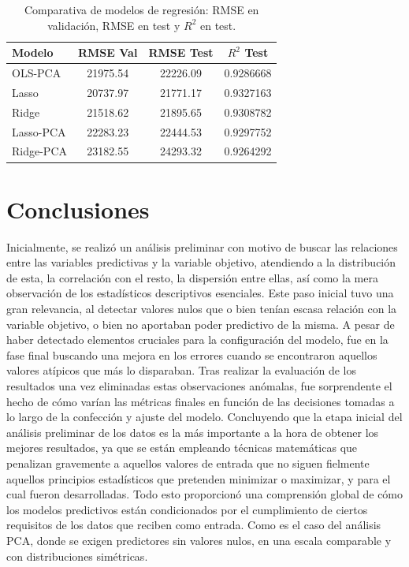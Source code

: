 \documentclass[a4paper,twocolumn]{article}
\begin{document}
	\begin{table}[tb]
		\centering
		{\small
		\caption{Comparativa de modelos de regresión: RMSE en validación, RMSE en test y $R^2$ en test.}
		\label{tab:resultados}
		\setlength{\tabcolsep}{4pt}
		\begin{tabular}{|l|c|c|c|}
			\hline\hline
			\textbf{Modelo} & \textbf{RMSE Val} & \textbf{RMSE Test} & \textbf{$R^2$ Test} \\\hline
			OLS-PCA & 21975.54 & 22226.09 & 0.9286668 \\\hline
			Lasso & 20737.97 & 21771.17 & 0.9327163 \\\hline
			Ridge & 21518.62 & 21895.65 & 0.9308782 \\\hline
			Lasso-PCA & 22283.23 & 22444.53 & 0.9297752 \\\hline
			Ridge-PCA & 23182.55 & 24293.32 & 0.9264292 \\\hline\hline
		\end{tabular}
		}
	\end{table}


	\section{Conclusiones}
	\label{sec:conclusiones}

	Inicialmente, se realizó un análisis preliminar con motivo de buscar las relaciones entre las variables predictivas y la variable objetivo, atendiendo a la distribución de esta,
	la correlación con el resto, la dispersión entre ellas, así como la mera observación de los estadísticos descriptivos esenciales. Este paso inicial tuvo una gran
	relevancia, al detectar valores nulos que o bien tenían escasa relación con la variable objetivo, o bien no aportaban poder predictivo de la misma.
	A pesar de haber detectado elementos cruciales para la configuración del modelo, fue en la fase final buscando una mejora en los errores cuando se encontraron
	aquellos valores atípicos que más lo disparaban.
	Tras realizar la evaluación de los resultados una vez eliminadas estas observaciones anómalas, fue sorprendente el hecho de cómo varían las métricas finales en función de las decisiones tomadas a lo largo de la confección y ajuste del modelo. Concluyendo
	que la etapa inicial del análisis preliminar de los datos es la más importante a la hora de obtener los mejores resultados, ya que se están empleando técnicas matemáticas que penalizan
	gravemente a aquellos valores de entrada que no siguen fielmente aquellos principios estadísticos que pretenden minimizar o maximizar, y para el cual
	fueron desarrolladas.
	Todo esto proporcionó una comprensión global de cómo los modelos predictivos están condicionados por el cumplimiento de ciertos requisitos de los datos que reciben como entrada. Como
	es el caso del análisis PCA, donde se exigen predictores sin valores nulos, en una escala comparable y con distribuciones simétricas.
	
\end{document}
